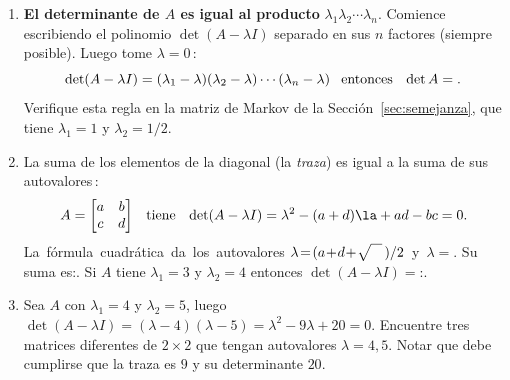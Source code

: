 \begin{enumerate}
\item {\bf El determinante de $A$ es igual al producto} $\lambda_1  \lambda_2\dotsb \lambda_n$. Comience escribiendo el polinomio $\det (A-\lambda I)$  separado en sus $n$ factores (siempre posible). Luego tome $\lambda=0$\,:
$$
\det(A-\lambda I)=(\lambda_1-\lambda)
(\lambda_2-\lambda)\dotsb (\lambda_n-\lambda)
\quad\hbox{entonces}\quad\det A=.
$$
Verifique esta regla en la matriz de Markov de la Sección~\ref{sec:semejanza}, que tiene $\lambda_1=1$ y $\lambda_2=1/2$.

\item La suma de los elementos de la diagonal (la \emph{traza}) es igual a la suma de sus autovalores\,:
$$
%
A=\begin{bmatrix} a&b\\ c&d\end{bmatrix}
\quad\hbox{tiene}\quad
\det(A-\lambda I)=
\lambda^2-(a+d)\la+ad-bc=0.
$$
%
La~fórmula~cuadrática~da~los~autovalores
$\lambda\!=\!(a\!+\!d\!+\!\sqrt{\quad\mathstrut}\,)
/2$~y~$\lambda\!=\!$.\linebreak
Su suma es:. Si $A$ tiene $\lambda_1=3$ y $\lambda_2=4$ entonces $\det (A-\lambda I)=$:.

\item Sea $A$ con $\lambda_1=4$ y $\lambda_2=5$, luego $\det (A-\lambda  I)=(\lambda-4)(\lambda-5)=\lambda^2-9\lambda+20=0$. Encuentre tres matrices diferentes de $2\times 2$ que tengan autovalores $\lambda=4,5$. Notar que debe cumplirse que la traza es $9$ y su determinante $20$.


\end{enumerate}
